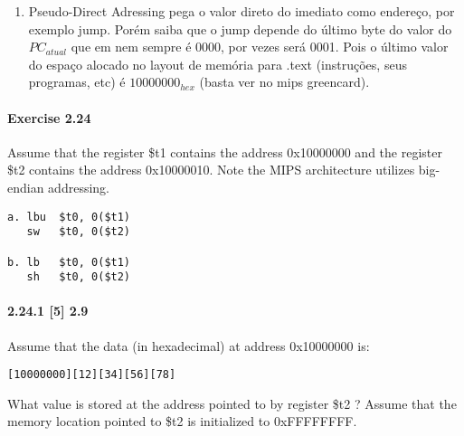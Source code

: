 \documentclass{article}
\begin{document}
\begin{enumerate}
\item Pseudo-Direct Adressing pega o valor direto do imediato como endereço, por
exemplo jump. Porém saiba que o jump depende do último byte do valor do
$PC_{atual}$ que em nem sempre é 0000, por vezes será 0001. Pois o último valor
do espaço alocado no layout de memória para .text (instruções, seus programas,
etc) é $10000000_{hex}$ (basta ver no mips greencard).
\end{enumerate}

\paragraph{Exercise 2.24}

Assume that the register \$t1 contains the address 0x10000000 and the register
\$t2 contains the address 0x10000010. Note the MIPS architecture utilizes big-
endian addressing.

\begin{verbatim}
a. lbu  $t0, 0($t1)
   sw   $t0, 0($t2)

b. lb   $t0, 0($t1)
   sh   $t0, 0($t2)
\end{verbatim}

\paragraph{2.24.1 [5] 2.9} Assume that the data (in hexadecimal) at address 
0x10000000 is:

\begin{verbatim}
[10000000][12][34][56][78]
\end{verbatim}

What value is stored at the address pointed to by register \$t2 ? Assume that 
the memory location pointed to \$t2 is initialized to 0xFFFFFFFF.
\end{document}
